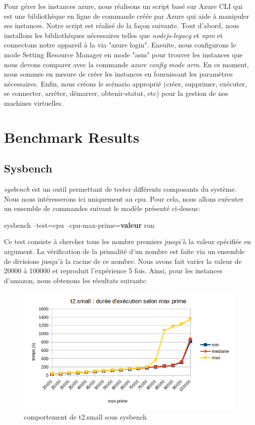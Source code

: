 \documentclass[11pt]{article}
\begin{document}
Pour gérer les instances azure, nous réalisons un script basé sur Azure CLI qui est une bibliothèque en ligne de commande créée par Azure qui aide à manipuler ses instances. Notre script est réalisé de la façon suivante. Tout d'abord, nous installons les bibliothèques nécessaires telles que \textit{nodejs-legacy} et \textit{npm} et connectons notre appareil à la via "azure login". Ensuite, nous configurons le mode Setting Resource Manager en mode "asm" pour trouver les instances que nous devons comparer avec la commande \textit{azure config mode arm}. En ce moment, nous sommes en mesure de créer les instances en fournissant les paramètres nécessaires. Enfin, nous créons le scénario approprié (créer, supprimer, exécuter, se connecter, arrêter, démarrer, obtenir-statut, etc) pour la gestion de nos machines virtuelles.

\section{Benchmark Results}
\subsection{Sysbench}
	\textit{sysbench} est un outil permettant de tester différents composants du système. Nous nous intéresserons ici uniquement au cpu. Pour cela, nous allons exécuter un ensemble de commandes suivant le modèle présenté ci-dessus:
	\newline
	\begin{center}
		sysbench --test=cpu --cpu-max-prime=\textbf{valeur} run
	\end{center}
	Ce test consiste à chercher tous les nombre premiers jusqu'à la valeur spécifiée en argument. La vérification de la primalité d'un nombre est faite via un ensemble de divisions jusqu'à la racine de ce nombre. Nous avons fait varier la valeur de 20000 à 100000 et reproduit l'expérience 5 fois.
	Ainsi, pour les instances d'amazon, nous obtenons les résultats suivants:
\begin{figure}
\centering
\includegraphics[width=0.9\linewidth]{images/cputSmallRaw}
\caption[t2.small sysbench]{comportement de t2.small sous sysbench}
\label{fig:cputsmallraw}
\end{figure}
\end{document}
